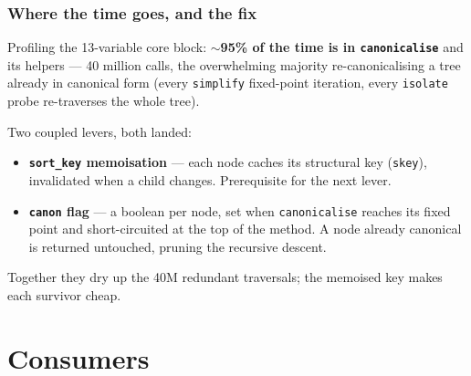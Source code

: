\documentclass[10pt,slidestop]{beamer}
\newcommand{\code}[1]{\texttt{#1}}
\begin{document}
\begin{frame}\frametitle{Where the time goes, and the fix}
  Profiling the 13-variable core block: \textbf{$\sim$95\% of the time is in
  \code{canonicalise}} and its helpers --- 40 million calls, the overwhelming
  majority re-canonicalising a tree already in canonical form (every
  \code{simplify} fixed-point iteration, every \code{isolate} probe re-traverses
  the whole tree).

  \medskip
  Two coupled levers, both landed:
  \begin{itemize}
  \item \textbf{\code{sort\_key} memoisation} --- each node caches its structural
    key (\code{skey}), invalidated when a child changes. Prerequisite for the
    next lever.\newline
  \item \textbf{\code{canon} flag} --- a boolean per node, set when
    \code{canonicalise} reaches its fixed point and short-circuited at the top of
    the method. A node already canonical is returned untouched, pruning the
    recursive descent.
  \end{itemize}

  \smallskip
  Together they dry up the 40M redundant traversals; the memoised key makes each
  survivor cheap.
\end{frame}

\section{Consumers}
\end{document}
